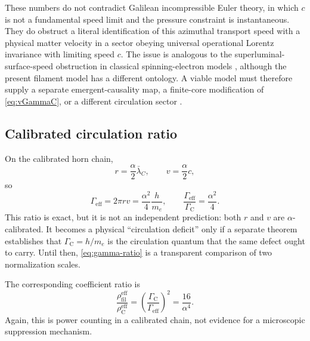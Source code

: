 \documentclass[aps,pre,preprint,notitlepage,nofootinbib,superscriptaddress]{revtex4-2}
\newcommand{\lC}{\bar\lambda_C}
\newcommand{\rhofil}{\rho_{\mathrm{fil}}^{\mathrm{eff}}}
\newcommand{\rhoCeff}{\rho_{\mathrm C}^{\mathrm{eff}}}
\newcommand{\Gammaeff}{\Gamma_{\mathrm{eff}}}
\newcommand{\GammaC}{\Gamma_{\mathrm C}}
\begin{document}
These numbers do not contradict Galilean incompressible Euler theory, in which \(c\) is not a fundamental speed limit and the pressure constraint is instantaneous.  They do obstruct a literal identification of this azimuthal transport speed with a physical matter velocity in a sector obeying universal operational Lorentz invariance with limiting speed \(c\).  The issue is analogous to the superluminal-surface-speed obstruction in classical spinning-electron models \cite{Ohanian1986}, although the present filament model has a different ontology.  A viable model must therefore supply a separate emergent-causality map, a finite-core modification of \cref{eq:vGammaC}, or a different circulation sector \cite{BarceloLiberatiVisser2026}.

\subsection{Calibrated circulation ratio}

On the calibrated horn chain,
\begin{equation}
  r=\frac{\alpha}{2}\lC,
  \qquad
  v=\frac{\alpha}{2}c,
\end{equation}
so
\begin{equation}
  \Gammaeff
  =
  2\pi rv
  =
  \frac{\alpha^2}{4}\frac{h}{m_e},
  \qquad
  \boxed{
  \frac{\Gammaeff}{\GammaC}
  =
  \frac{\alpha^2}{4}
  }.
  \label{eq:gamma-ratio}
\end{equation}
This ratio is exact, but it is not an independent prediction: both \(r\) and \(v\) are \(\alpha\)-calibrated.  It becomes a physical ``circulation deficit'' only if a separate theorem establishes that \(\GammaC=h/m_e\) is the circulation quantum that the same defect ought to carry.  Until then, \cref{eq:gamma-ratio} is a transparent comparison of two normalization scales.

The corresponding coefficient ratio is
\begin{equation}
  \frac{\rhofil}{\rhoCeff}
  =
  \left(\frac{\GammaC}{\Gammaeff}\right)^2
  =
  \frac{16}{\alpha^4}.
  \label{eq:rho-ratio-gamma}
\end{equation}
Again, this is power counting in a calibrated chain, not evidence for a microscopic suppression mechanism.
\end{document}
